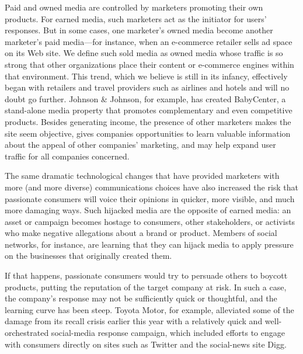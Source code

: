 Paid and owned media are controlled by marketers promoting their own
products. For earned media, such marketers act as the initiator for
users' responses. But in some cases, one marketer's owned media become
another marketer's paid media---for instance, when an e-commerce
retailer sells ad space on its Web site. We define such sold media as
owned media whose traffic is so strong that other organizations place
their content or e-commerce engines within that environment. This trend,
which we believe is still in its infancy, effectively began with
retailers and travel providers such as airlines and hotels and will no
doubt go further. Johnson \& Johnson, for example, has created
BabyCenter, a stand-alone media property that promotes complementary and
even competitive products. Besides generating income, the presence of
other marketers makes the site seem objective, gives companies
opportunities to learn valuable information about the appeal of other
companies' marketing, and may help expand user traffic for all companies
concerned.

The same dramatic technological changes that have provided marketers
with more (and more diverse) communications choices have also increased
the risk that passionate consumers will voice their opinions in quicker,
more visible, and much more damaging ways. Such hijacked media are the
opposite of earned media: an asset or campaign becomes hostage to
consumers, other stakeholders, or activists who make negative
allegations about a brand or product. Members of social networks, for
instance, are learning that they can hijack media to apply pressure on
the businesses that originally created them.

If that happens, passionate consumers would try to persuade others to
boycott products, putting the reputation of the target company at risk.
In such a case, the company's response may not be sufficiently quick or
thoughtful, and the learning curve has been steep. Toyota Motor, for
example, alleviated some of the damage from its recall crisis earlier
this year with a relatively quick and well-orchestrated social-media
response campaign, which included efforts to engage with consumers
directly on sites such as Twitter and the social-news site Digg.



